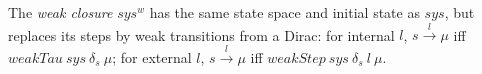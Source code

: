 \begin{definition}
  \label{def:weakclosure}
  \leanok
  The \emph{weak closure} $sys^w$ has the same state space and initial state as $sys$, but replaces its steps by weak transitions from a Dirac: for internal $l$, $s \xrightarrow{l} \mu$ iff $weakTau\ sys\ \delta_s\ \mu$; for external $l$, $s \xrightarrow{l} \mu$ iff $weakStep\ sys\ \delta_s\ l\ \mu$.
\end{definition}
